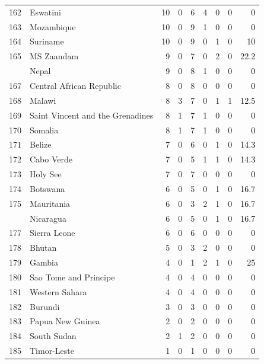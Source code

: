 \documentclass[12pt, a4paper,oneside]{book}
\theoremstyle{definition}
\begin{document}
\begin{longtable}{llrrrrrrr}
	162 & Eswatini & 10 & 0 & 6 & 4 & 0 & 0 & \textcolor{black}{0}\\
	\rowcolor{gray!6}  163 & Mozambique & 10 & 0 & 9 & 1 & 0 & 0 & \textcolor{black}{0}\\
	164 & Suriname & 10 & 0 & 9 & 0 & 1 & 0 & \textcolor{black}{10}\\
	\rowcolor{gray!6}  165 & MS Zaandam & 9 & 0 & 7 & 0 & 2 & 0 & \textcolor{black}{22.2}\\
	\addlinespace
	166 & Nepal & 9 & 0 & 8 & 1 & 0 & 0 & \textcolor{black}{0}\\
	\rowcolor{gray!6}  167 & Central African Republic & 8 & 0 & 8 & 0 & 0 & 0 & \textcolor{black}{0}\\
	168 & Malawi & 8 & 3 & 7 & 0 & 1 & 1 & \textcolor{black}{12.5}\\
	\rowcolor{gray!6}  169 & Saint Vincent and the Grenadines & 8 & 1 & 7 & 1 & 0 & 0 & \textcolor{black}{0}\\
	170 & Somalia & 8 & 1 & 7 & 1 & 0 & 0 & \textcolor{black}{0}\\
	\addlinespace
	\rowcolor{gray!6}  171 & Belize & 7 & 0 & 6 & 0 & 1 & 0 & \textcolor{black}{14.3}\\
	172 & Cabo Verde & 7 & 0 & 5 & 1 & 1 & 0 & \textcolor{black}{14.3}\\
	\rowcolor{gray!6}  173 & Holy See & 7 & 0 & 7 & 0 & 0 & 0 & \textcolor{black}{0}\\
	174 & Botswana & 6 & 0 & 5 & 0 & 1 & 0 & \textcolor{black}{16.7}\\
	\rowcolor{gray!6}  175 & Mauritania & 6 & 0 & 3 & 2 & 1 & 0 & \textcolor{black}{16.7}\\
	\addlinespace
	176 & Nicaragua & 6 & 0 & 5 & 0 & 1 & 0 & \textcolor{black}{16.7}\\
	\rowcolor{gray!6}  177 & Sierra Leone & 6 & 0 & 6 & 0 & 0 & 0 & \textcolor{black}{0}\\
	178 & Bhutan & 5 & 0 & 3 & 2 & 0 & 0 & \textcolor{black}{0}\\
	\rowcolor{gray!6}  179 & Gambia & 4 & 0 & 1 & 2 & 1 & 0 & \textcolor{black}{25}\\
	180 & Sao Tome and Principe & 4 & 0 & 4 & 0 & 0 & 0 & \textcolor{black}{0}\\
	\addlinespace
	\rowcolor{gray!6}  181 & Western Sahara & 4 & 0 & 4 & 0 & 0 & 0 & \textcolor{black}{0}\\
	182 & Burundi & 3 & 0 & 3 & 0 & 0 & 0 & \textcolor{black}{0}\\
	\rowcolor{gray!6}  183 & Papua New Guinea & 2 & 0 & 2 & 0 & 0 & 0 & \textcolor{black}{0}\\
	184 & South Sudan & 2 & 1 & 2 & 0 & 0 & 0 & \textcolor{black}{0}\\
	\rowcolor{gray!6}  185 & Timor-Leste & 1 & 0 & 1 & 0 & 0 & 0 & \textcolor{black}{0}\\*
\end{longtable}
\endgroup{}
\end{document}
